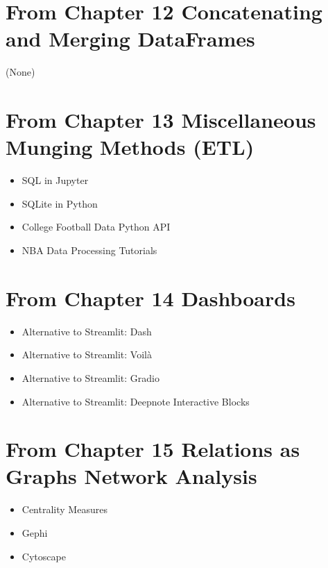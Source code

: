 \documentclass[letterpaper,10pt,english]{jupyterBook}
\begin{document}
\section{From Chapter 12 \sphinxhyphen{} Concatenating and Merging DataFrames}
\label{\detokenize{loyo-list:from-chapter-12-concatenating-and-merging-dataframes}}
\sphinxAtStartPar
(None)


\section{From Chapter 13 \sphinxhyphen{} Miscellaneous Munging Methods (ETL)}
\label{\detokenize{loyo-list:from-chapter-13-miscellaneous-munging-methods-etl}}\begin{itemize}
\item {} 
\sphinxAtStartPar
SQL in Jupyter

\item {} 
\sphinxAtStartPar
SQLite in Python

\item {} 
\sphinxAtStartPar
College Football Data Python API

\item {} 
\sphinxAtStartPar
NBA Data Processing Tutorials

\end{itemize}


\section{From Chapter 14 \sphinxhyphen{} Dashboards}
\label{\detokenize{loyo-list:from-chapter-14-dashboards}}\begin{itemize}
\item {} 
\sphinxAtStartPar
Alternative to Streamlit: Dash

\item {} 
\sphinxAtStartPar
Alternative to Streamlit: Voilà

\item {} 
\sphinxAtStartPar
Alternative to Streamlit: Gradio

\item {} 
\sphinxAtStartPar
Alternative to Streamlit: Deepnote Interactive Blocks

\end{itemize}


\section{From Chapter 15 \sphinxhyphen{} Relations as Graphs \sphinxhyphen{} Network Analysis}
\label{\detokenize{loyo-list:from-chapter-15-relations-as-graphs-network-analysis}}\begin{itemize}
\item {} 
\sphinxAtStartPar
Centrality Measures

\item {} 
\sphinxAtStartPar
Gephi

\item {} 
\sphinxAtStartPar
Cytoscape

\end{itemize}
\end{document}
